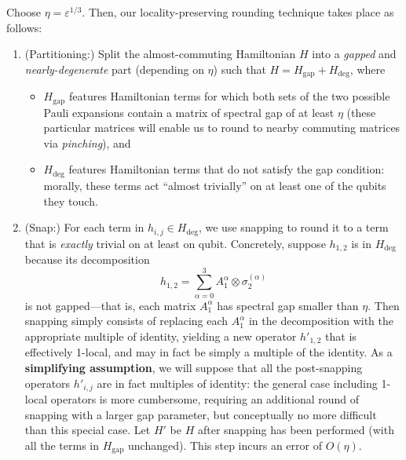 \documentclass[11pt]{article}
\newcommand{\gap}{\mathrm{gap}}
\renewcommand{\deg}{\mathrm{deg}}
\theoremstyle{plain}
\newcommand{\eps}{\varepsilon}
\begin{document}
Choose $\eta =\eps^{1/3}$. Then, our locality-preserving rounding technique takes place as follows:
\begin{enumerate}
    \item (Partitioning:) Split the almost-commuting Hamiltonian $H$ into a \emph{gapped} and \emph{nearly-degenerate} part (depending on $\eta$) such that $H= H_{\gap} + H_{\deg}$, where
    \begin{itemize}
        \item $H_{\gap}$ features Hamiltonian terms for which both sets of the two possible Pauli expansions contain a matrix of spectral gap of at least $\eta$ (these particular matrices will enable us to round to nearby commuting matrices via \emph{pinching}), and

        \item $H_{\deg}$ features Hamiltonian terms that do not satisfy the gap condition: morally, these terms act ``almost trivially'' on at least one of the qubits they touch. 
    \end{itemize}
    \item (Snap:) For each term in $h_{i,j} \in H_{\deg}$, we use snapping to round it to a term that is \emph{exactly} trivial on at least on qubit. Concretely, suppose $h_{1,2}$ is in $H_{\deg}$ because its decomposition
    \[ h_{1,2} = \sum_{\alpha=0}^{3} A_1^\alpha \otimes \sigma_2^{(\alpha)}\]
    is not gapped---that is, each matrix $A_1^\alpha$ has spectral gap smaller than $\eta$. Then snapping simply consists of replacing each $A_1^\alpha$ in the decomposition with the appropriate multiple of identity, yielding a new operator $h'_{1,2}$ that is effectively 1-local, and may in fact be simply a multiple of the identity. As a \textbf{simplifying assumption}, we will suppose that all the post-snapping operators $h'_{i,j}$ are in fact multiples of identity: the general case including 1-local operators is more cumbersome, requiring an additional round of snapping with a larger gap parameter, but conceptually no more difficult than this special case. Let $H'$ be $H$ after snapping has been performed (with all the terms in $H_{\gap}$ unchanged). This step incurs an error of $O(\eta)$.


\end{enumerate}
\end{document}

